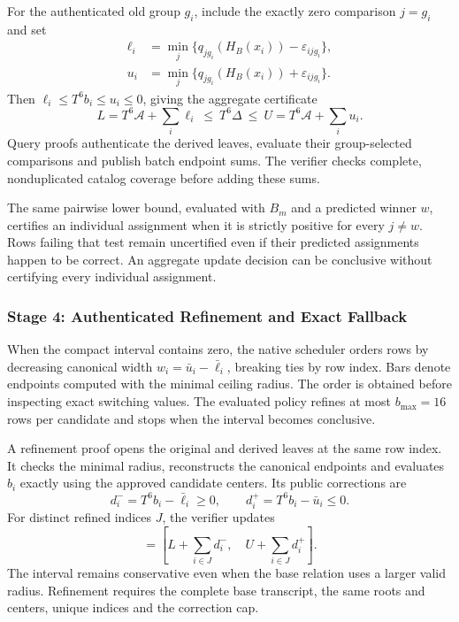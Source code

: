 For the authenticated old group $g_i$, include the exactly zero comparison
$j=g_i$ and set
\begin{align}
 \ell_i&=\min_j\{q_{jg_i}(H_B(x_i))-\varepsilon_{ijg_i}\},\nonumber\\
 u_i&=\min_j\{q_{jg_i}(H_B(x_i))+\varepsilon_{ijg_i}\}.
 \label{eq:methodology-row-bounds}
\end{align}
Then $\ell_i\leq T^6b_i\leq u_i\leq0$, giving the aggregate certificate
\begin{equation}
 L=T^6\mathcal A+\sum_i\ell_i
 \ \leq\ T^6\Delta\ \leq\
 U=T^6\mathcal A+\sum_i u_i.
 \label{eq:methodology-interval}
\end{equation}
Query proofs authenticate the derived leaves, evaluate their group-selected
comparisons and publish batch endpoint sums. The verifier checks complete,
nonduplicated catalog coverage before adding these sums.

The same pairwise lower bound, evaluated with $B_m$ and a predicted winner
$w$, certifies an individual assignment when it is strictly positive for
every $j\ne w$. Rows failing that test remain uncertified even if their
predicted assignments happen to be correct. An aggregate update decision
can be conclusive without certifying every individual assignment.

\subsubsection{Stage 4: Authenticated Refinement and Exact Fallback}
\label{sec:methodology-refinement}
When the compact interval contains zero, the native scheduler orders rows
by decreasing canonical width $w_i=\bar u_i-\bar\ell_i$, breaking ties by
row index. Bars denote endpoints computed with the minimal ceiling radius.
The order is obtained before inspecting exact switching values. The
evaluated policy refines at most $b_{\max}=16$ rows per candidate and stops
when the interval becomes conclusive.

A refinement proof opens the original and derived leaves at the same row
index. It checks the minimal radius, reconstructs the canonical endpoints
and evaluates $b_i$ exactly using the approved candidate centers. Its public
corrections are
\begin{equation}
 d_i^-=T^6b_i-\bar\ell_i\geq0,
 \qquad d_i^+=T^6b_i-\bar u_i\leq0.
 \label{eq:methodology-corrections}
\end{equation}
For distinct refined indices $J$, the verifier updates
\begin{equation}
 [L',U']=\left[L+\sum_{i\in J}d_i^-,\quad
                    U+\sum_{i\in J}d_i^+\right].
 \label{eq:methodology-refined}
\end{equation}
The interval remains conservative even when the base relation uses a larger
valid radius. Refinement requires the complete base transcript, the same
roots and centers, unique indices and the correction cap.

